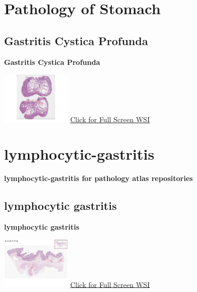 \documentclass[
  letterpaper,
  paper=6in:9in,
  pagesize=pdftex,
  headinclude=on,
  footinclude=on,
  12pt]{scrbook}
\begin{document}
\hypertarget{sec-pathology-of-stomach}{%
\chapter{Pathology of Stomach}\label{sec-pathology-of-stomach}}

\hypertarget{sec-gastritis-cystica-profunda}{%
\section{Gastritis Cystica
Profunda}\label{sec-gastritis-cystica-profunda}}

\textbf{Gastritis Cystica Profunda}

\href{https://images.patolojiatlasi.com/gastritis-cystica-profunda/HE.html}{\includegraphics[width=0.25\textwidth,height=\textheight]{./screenshots/gastritis-cystica-profunda_screenshot.png}}
\href{https://images.patolojiatlasi.com/gastritis-cystica-profunda/HE.html}{Click
for Full Screen WSI}

\hypertarget{lymphocytic-gastritis}{%
\chapter{lymphocytic-gastritis}\label{lymphocytic-gastritis}}

\textbf{lymphocytic-gastritis for pathology atlas repositories}

\hypertarget{sec-lymphocytic-gastritis}{%
\section{lymphocytic gastritis}\label{sec-lymphocytic-gastritis}}

\textbf{lymphocytic gastritis}

\href{https://images.patolojiatlasi.com/lymphocytic-gastritis/HE.html}{\includegraphics[width=0.25\textwidth,height=\textheight]{./screenshots/lymphocytic-gastritisHE_screenshot.png}}
\href{https://images.patolojiatlasi.com/lymphocytic-gastritis/HE.html}{Click
for Full Screen WSI}
\end{document}
